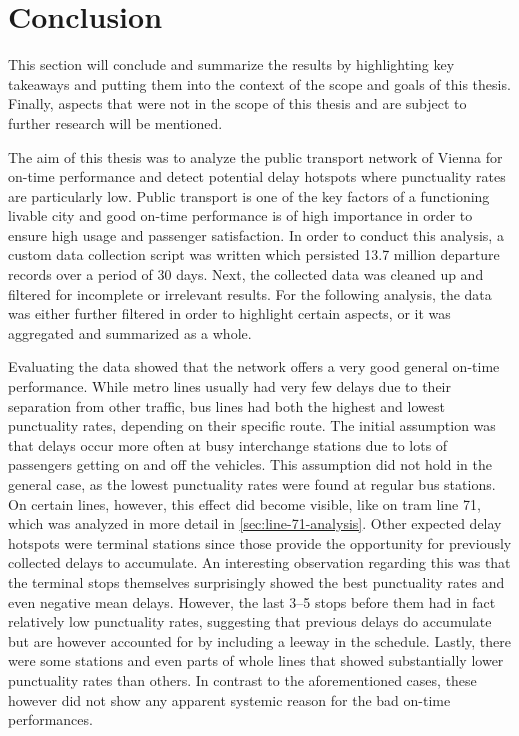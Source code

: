 \section{Conclusion}
\label{sec:conclusion}

This section will conclude and summarize the results by highlighting key takeaways and putting them into the context of the scope and goals of this thesis. Finally, aspects that were not in the scope of this thesis and are subject to further research will be mentioned.

The aim of this thesis was to analyze the public transport network of Vienna for on-time performance and detect potential delay hotspots where punctuality rates are particularly low. Public transport is one of the key factors of a functioning livable city and good on-time performance is of high importance in order to ensure high usage and passenger satisfaction. In order to conduct this analysis, a custom data collection script was written which persisted 13.7 million departure records over a period of 30 days. Next, the collected data was cleaned up and filtered for incomplete or irrelevant results. For the following analysis, the data was either further filtered in order to highlight certain aspects, or it was aggregated and summarized as a whole.

Evaluating the data showed that the network offers a very good general on-time performance. While metro lines usually had very few delays due to their separation from other traffic, bus lines had both the highest and lowest punctuality rates, depending on their specific route. The initial assumption was that delays occur more often at busy interchange stations due to lots of passengers getting on and off the vehicles. This assumption did not hold in the general case, as the lowest punctuality rates were found at regular bus stations. On certain lines, however, this effect did become visible, like on tram line 71, which was analyzed in more detail in \cref{sec:line-71-analysis}. Other expected delay hotspots were terminal stations since those provide the opportunity for previously collected delays to accumulate. An interesting observation regarding this was that the terminal stops themselves surprisingly showed the best punctuality rates and even negative mean delays. However, the last 3--5 stops before them had in fact relatively low punctuality rates, suggesting that previous delays do accumulate but are however accounted for by including a leeway in the schedule. Lastly, there were some stations and even parts of whole lines that showed substantially lower punctuality rates than others. In contrast to the aforementioned cases, these however did not show any apparent systemic reason for the bad on-time performances.

